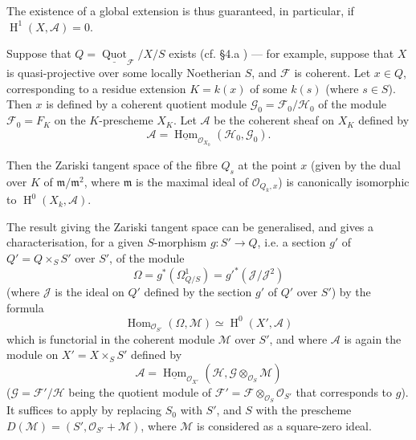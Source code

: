 The existence of a global extension is thus guaranteed, in particular, if $\operatorname{H}^1(X,\mathcal{A})=0$.


\begin{corollary}\label{fga3.iv-5-corollary-5.3}
  Suppose that $Q=\underline{\operatorname{Quot}}_\mathcal{F}/X/S$ exists (cf. §4.a ) --- for example, suppose that $X$ is quasi-projective over some locally Noetherian $S$, and $\mathcal{F}$ is coherent.
  Let $x\in Q$, corresponding to a residue extension $K=k(x)$ of some $k(s)$ (where $s\in S$).
  Then $x$ is defined by a coherent quotient module $\mathcal{G}_0=\mathcal{F}_0/\mathcal{H}_0$ of the module $\mathcal{F}_0=F_K$ on the $K$-prescheme $X_K$.
  Let $\mathcal{A}$ be the coherent sheaf on $X_K$ defined by
  \[
    \mathcal{A} = \underline{\operatorname{Hom}}_{\mathcal{O}_{X_0}}(\mathcal{H}_0,\mathcal{G}_0).
  \]

  Then the Zariski tangent space of the fibre $Q_s$ at the point $x$ (given by the dual over $K$ of $\mathfrak{m}/\mathfrak{m}^2$, where $\mathfrak{m}$ is the maximal ideal of $\mathcal{O}_{Q_k,x}$) is canonically isomorphic to $\operatorname{H}^0(X_k,\mathcal{A})$.
\end{corollary}


The result giving the Zariski tangent space can be generalised, and gives a characterisation, for a given $S$-morphism $g\colon S'\to Q$, i.e. a section $g'$ of $Q'=Q\times_S S'$ over $S'$, of the module
\[
  \Omega
  = g^*(\Omega_{Q/S}^1)
  = {g'}^*(\mathcal{J}/\mathcal{J}^2)
\]
(where $\mathcal{J}$ is the ideal on $Q'$ defined by the section $g'$ of $Q'$ over $S'$) by the formula
\[
  \operatorname{Hom}_{\mathcal{O}_{S'}}(\Omega,\mathcal{M})
  \simeq \operatorname{H}^0(X',\mathcal{A})
\]
which is functorial in the coherent module $\mathcal{M}$ over $S'$, and where $\mathcal{A}$ is again the module on $X'=X\times_S S'$ defined by
\[
  \mathcal{A} = \underline{\operatorname{Hom}}_{\mathcal{O}_{X'}}(\mathcal{H},\mathcal{G}\otimes_{\mathcal{O}_S}\mathcal{M})
\]
($\mathcal{G}=\mathcal{F}'/\mathcal{H}$ being the quotient module of $\mathcal{F}'=\mathcal{F}\otimes_{\mathcal{O}_S}\mathcal{O}_{S'}$ that corresponds to $g$).
It suffices to apply  by replacing $S_0$ with $S'$, and $S$ with the prescheme $D(\mathcal{M})=(S',\mathcal{O}_{S'}+\mathcal{M})$, where $\mathcal{M}$ is considered as a square-zero ideal.

